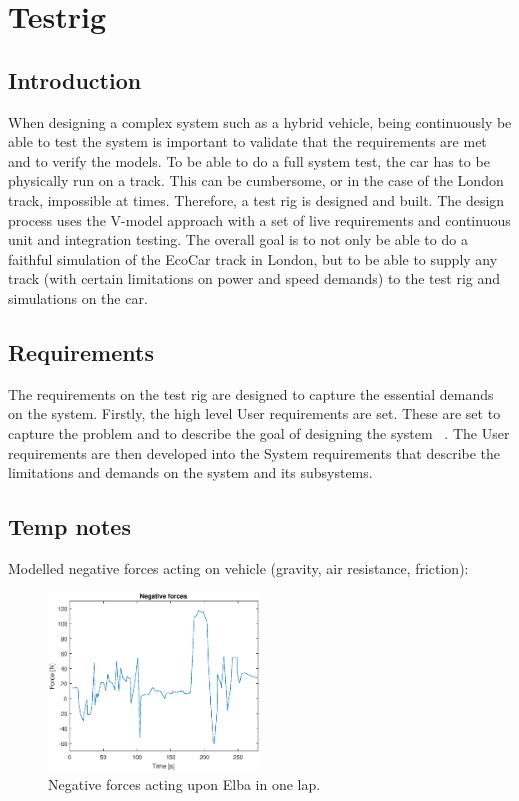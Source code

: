 \chapter{Testrig}
\section{Introduction}
When designing a complex system such as a hybrid vehicle, being continuously be
able to test the system is important to validate that the requirements are met
and to verify the models. To be able to do a full system test, the car has to be
physically run on a track. This can be cumbersome, or in the case of the London
track, impossible at times. Therefore, a test rig is designed and built. The
design process uses the V-model approach with a set of live requirements and
continuous unit and integration testing. The overall goal is to not only be able
to do a faithful simulation of the EcoCar track in London, but to be able to
supply any track (with certain limitations on power and speed demands) to the
test rig and simulations on the car.

\section{Requirements}
The requirements on the test rig are designed to capture the essential demands
on the system. Firstly, the high level User requirements are set. These are set
to capture the problem and to describe the goal of designing the system
~\cite{ibm_req}. The User requirements are then developed into the System
requirements that describe the limitations and demands on the system and its
subsystems.

\section{Temp notes}
Modelled negative forces acting on vehicle (gravity, air resistance, friction): 

\begin{figure}[H]
    \label{fig:testrig_negative_forces}
    \centering
    \includegraphics[width=0.5\textwidth]{./img/testrig_negative_forces.eps}
    \caption{Negative forces acting upon Elba in one lap.}
\end{figure}

